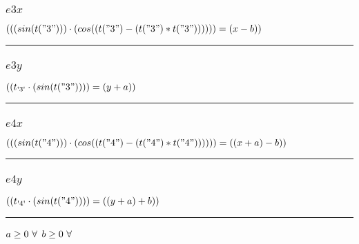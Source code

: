 \documentclass[11pt]{article}
\begin{document}
\subsubsection*{$e3x$}
$
((( sin(t("3")) ) \cdot ( cos((t("3") - (t("3") * t("3")))) )) = (x - b))
$
\vspace{5pt}
\hrule
\subsubsection*{$e3y$}
$
((t_\text{\textquotesingle 3\textquotesingle} \cdot ( sin(t("3")) )) = (y + a))
$
\vspace{5pt}
\hrule
\subsubsection*{$e4x$}
$
((( sin(t("4")) ) \cdot ( cos((t("4") - (t("4") * t("4")))) )) = ((x + a) - b))
$
\vspace{5pt}
\hrule
\subsubsection*{$e4y$}
$
((t_\text{\textquotesingle 4\textquotesingle} \cdot ( sin(t("4")) )) = ((y + a) + b))
$
\vspace{5pt}
\hrule
\bigskip
$a\geq 0 ~ \forall \\$
$b\geq 0 ~ \forall \\$
\end{document}

